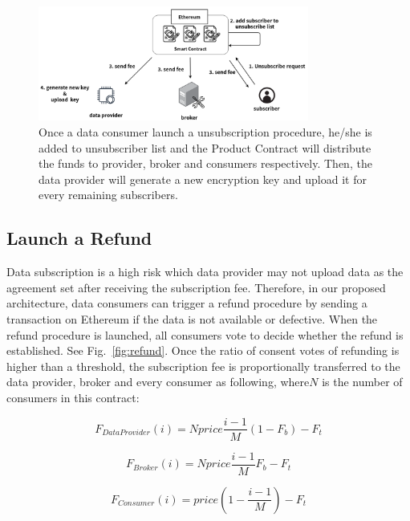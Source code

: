 \documentclass[conference]{IEEEtran}
\begin{document}
\begin{figure}[h]
    \centering
    \includegraphics[width=3.5in]{unsubscribe}
    \caption{Once a data consumer launch a unsubscription procedure, he/she is added to unsubscriber list and the Product Contract will distribute the funds to provider, broker and consumers respectively. Then, the data provider will generate a new encryption key and upload it for every remaining subscribers.}
    \label{fig:unsubscribe}
\end{figure}

\subsection{Launch a Refund}
Data subscription is a high risk which data provider may not upload data as the agreement set after receiving the subscription fee. Therefore, in our proposed architecture, data consumers can trigger a refund procedure by sending a transaction on Ethereum if the data is not available or defective. When the refund procedure is launched, all consumers vote to decide whether the refund is established. See Fig.~\ref{fig:refund}. Once the ratio of consent votes of refunding is higher than a threshold, the subscription fee is proportionally transferred to the data provider, broker and every consumer as following, where$N$ is the number of consumers in this contract:

\begin{equation}
    F_{DataProvider}(i) = Nprice \frac{i-1}{M} (1-F_{b}) -F_{t}
\end{equation}

\begin{equation}
    F_{Broker}(i) = Nprice \frac{i-1}{M} F_{b} -F_{t}
\end{equation}

\begin{equation}
    F_{Consumer}(i) = price (1-\frac{i-1}{M}) -F_{t}
\end{equation}
\end{document}
